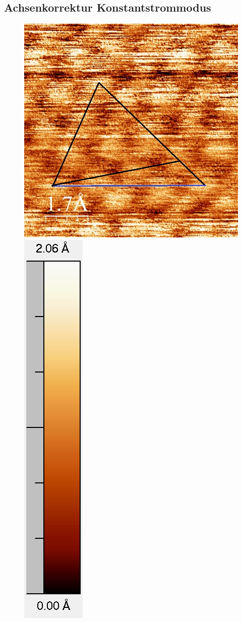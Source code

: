 \documentclass[12pt,a4paper]{article}
\begin{document}
\subsection{Achsenkorrektur Konstantstrommodus}
\begin{figure}[H]
\centering
\includegraphics[scale=0.36]{Bilder/Atome/strom1_h.jpg}
\includegraphics[scale=0.48]{Bilder/Atome/strom1_scale.png}

\end{figure}
\end{document}
